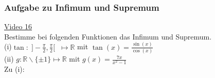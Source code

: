 \subsubsection{Aufgabe zu Infimum und Supremum}
\href{https://youtu.be/HnmGV8AtkOc}{Video 16}\\
Bestimme bei folgenden Funktionen das Infimum und Supremum.\vspace*{2mm}\\
(i)\;\;\;$ \tan:\; ]-\frac{\pi}{2},\frac{\pi}{2}[\;\;\longmapsto \mathbb{R} $ mit $ \tan(x)=\frac{\sin(x)}{\cos(x)} $\vspace*{2mm}\\
(ii)\; $ g:\mathbb{R}\backslash\{\pm 1\} \longmapsto \mathbb{R}$ mit $ g(x)=\frac{7x}{x^2-1} $\vspace*{2mm}\\
Zu (i):\\

